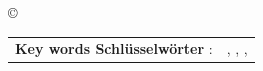 \begin{titlepage}
\begin{center}
\copyright\ \jahr\\[5.5ex]
\vfill
\begin{table}[htbp]
	\begin{tabular}{ll}
		\textbf{\ifx \textLanguage\eng Key words \else Schlüsselwörter \fi}:
				& \schlagwortA, \schlagwortB, \schlagwortC, \schlagwortD
	\end{tabular}
\end{table}
\end{center}
\vfill
\singlespacing
\small
\noindent 
\end{titlepage}
